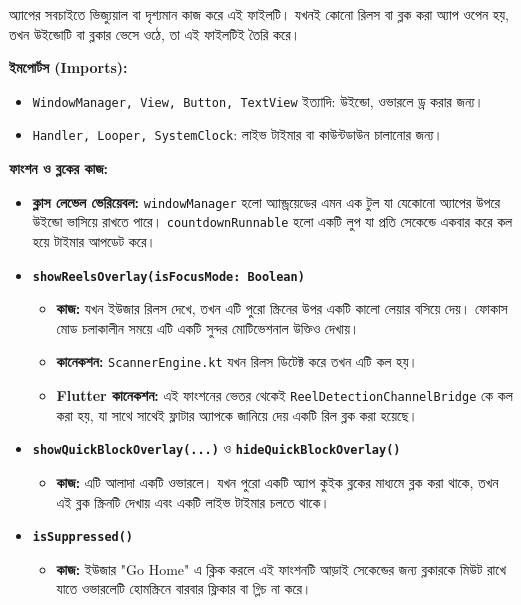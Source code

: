 \documentclass[12pt, a4paper]{article}
\begin{document}
\begin{tcolorbox}[colback=orange!5!white,colframe=orange!75!black,title={৩. OverlayManager.kt}]
অ্যাপের সবচাইতে ভিজ্যুয়াল বা দৃশ্যমান কাজ করে এই ফাইলটি। যখনই কোনো রিলস বা ব্লক করা অ্যাপ ওপেন হয়, তখন উইন্ডোটি বা ব্লকার ভেসে ওঠে, তা এই ফাইলটিই তৈরি করে।

\textbf{ইমপোর্টস (Imports):}
\begin{itemize}[label=$\circ$]
    \item \texttt{WindowManager, View, Button, TextView} ইত্যাদি: উইন্ডো, ওভারলে ড্র করার জন্য।
    \item \texttt{Handler, Looper, SystemClock}: লাইভ টাইমার বা কাউন্টডাউন চালানোর জন্য।
\end{itemize}

\textbf{ফাংশন ও ব্লকের কাজ:}
\begin{itemize}[label=$\circ$]
    \item \textbf{ক্লাস লেভেল ভেরিয়েবল:} \texttt{windowManager} হলো অ্যান্ড্রয়েডের এমন এক টুল যা যেকোনো অ্যাপের উপরে উইন্ডো ভাসিয়ে রাখতে পারে। \texttt{countdownRunnable} হলো একটি লুপ যা প্রতি সেকেন্ডে একবার করে কল হয়ে টাইমার আপডেট করে।
    
    \item \textbf{\texttt{showReelsOverlay(isFocusMode: Boolean)}}
    \begin{itemize}[label=--]
        \item \textbf{কাজ:} যখন ইউজার রিলস দেখে, তখন এটি পুরো স্ক্রিনের উপর একটি কালো লেয়ার বসিয়ে দেয়। ফোকাস মোড চলাকালীন সময়ে এটি একটি সুন্দর মোটিভেশনাল উক্তিও দেখায়।
        \item \textbf{কানেকশন:} \texttt{ScannerEngine.kt} যখন রিলস ডিটেক্ট করে তখন এটি কল হয়।
        \item \textbf{Flutter কানেকশন:} এই ফাংশনের ভেতর থেকেই \texttt{ReelDetectionChannelBridge} কে কল করা হয়, যা সাথে সাথেই ফ্লাটার অ্যাপকে জানিয়ে দেয় একটি রিল ব্লক করা হয়েছে।
    \end{itemize}

    \item \textbf{\texttt{showQuickBlockOverlay(...)}} ও \textbf{\texttt{hideQuickBlockOverlay()}}
    \begin{itemize}[label=--]
        \item \textbf{কাজ:} এটি আলাদা একটি ওভারলে। যখন পুরো একটি অ্যাপ কুইক ব্লকের মাধ্যমে ব্লক করা থাকে, তখন এই ব্লক স্ক্রিনটি দেখায় এবং একটি লাইভ টাইমার চলতে থাকে।
    \end{itemize}

    \item \textbf{\texttt{isSuppressed()}}
    \begin{itemize}[label=--]
        \item \textbf{কাজ:} ইউজার "Go Home" এ ক্লিক করলে এই ফাংশনটি আড়াই সেকেন্ডের জন্য ব্লকারকে মিউট রাখে যাতে ওভারলেটি হোমস্ক্রিনে বারবার ফ্লিকার বা গ্লিচ না করে। 
    \end{itemize}
    

\end{itemize}
\end{tcolorbox}
\end{document}
